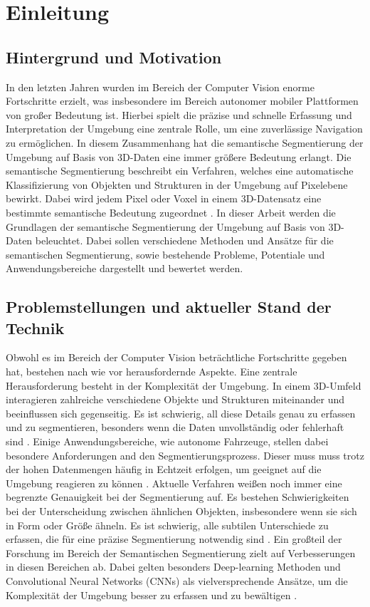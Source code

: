 \chapter{Einleitung}

\section{Hintergrund und Motivation}

In den letzten Jahren wurden im Bereich der Computer Vision enorme Fortschritte
erzielt, was insbesondere im Bereich autonomer mobiler Plattformen von großer
Bedeutung ist. Hierbei spielt die präzise und schnelle Erfassung und
Interpretation der Umgebung eine zentrale Rolle, um eine zuverlässige
Navigation zu ermöglichen. In diesem Zusammenhang hat die semantische
Segmentierung der Umgebung auf Basis von 3D-Daten eine immer größere Bedeutung
erlangt. Die semantische Segmentierung beschreibt ein Verfahren, welches eine
automatische Klassifizierung von Objekten und Strukturen in der Umgebung auf
Pixelebene bewirkt. Dabei wird jedem Pixel oder Voxel in einem 3D-Datensatz
eine bestimmte semantische Bedeutung zugeordnet \cite{CGV-079}. In dieser
Arbeit werden die Grundlagen der semantische Segmentierung der Umgebung auf
Basis von 3D-Daten beleuchtet. Dabei sollen verschiedene Methoden und Ansätze
für die semantischen Segmentierung, sowie bestehende Probleme, Potentiale und
Anwendungsbereiche dargestellt und bewertet werden.\cite{9102769}

\section{Problemstellungen und aktueller Stand der Technik}

Obwohl es im Bereich der Computer Vision beträchtliche Fortschritte gegeben
hat, bestehen nach wie vor herausfordernde Aspekte. Eine zentrale
Herausforderung besteht in der Komplexität der Umgebung. In einem 3D-Umfeld
interagieren zahlreiche verschiedene Objekte und Strukturen miteinander und
beeinflussen sich gegenseitig. Es ist schwierig, all diese Details genau zu
erfassen und zu segmentieren, besonders wenn die Daten unvollständig oder
fehlerhaft sind \cite{CGV-079}. Einige Anwendungsbereiche, wie autonome
Fahrzeuge, stellen dabei besondere Anforderungen and den Segmentierungsprozess.
Dieser muss muss trotz der hohen Datenmengen häufig in Echtzeit erfolgen, um
geeignet auf die Umgebung reagieren zu können \cite{8206396}. Aktuelle
Verfahren weißen noch immer eine begrenzte Genauigkeit bei der Segmentierung
auf. Es bestehen Schwierigkeiten bei der Unterscheidung zwischen
ähnlichen Objekten, insbesondere wenn sie sich in Form oder Größe ähneln. Es
ist schwierig, alle subtilen Unterschiede zu erfassen, die für eine präzise
Segmentierung notwendig sind \cite{9420573}. Ein großteil der Forschung im
Bereich der Semantischen Segmentierung zielt auf Verbesserungen in diesen
Bereichen ab. Dabei gelten besonders Deep-learning Methoden und Convolutional
Neural Networks (CNNs) als vielversprechende Ansätze, um die Komplexität der
Umgebung besser zu erfassen und zu bewältigen \cite{9423307,8100085}.